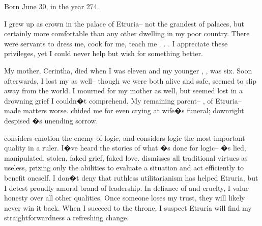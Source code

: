 \documentclass[char]{Kos}
\begin{document}
\name{\cGroom{}}

Born June 30, in the year 274.

I grew up as crown \cGroom{\prince} in the palace of Etruria-- not the grandest of palaces, but certainly more comfortable than any other dwelling in my poor country. There were servants to dress me, cook for me, teach me . . . I appreciate these privileges, yet I could never help but wish for something better.

My mother, Cerintha, died when I was eleven and my younger \cPoet{\sibling}, \cPoet{\nickname}, was six. Soon afterwards, I lost my \cPoet{\sibling} as well-- though we were both alive and safe, \cPoet{\they} seemed to slip away from the world. I mourned for my mother as well, but \cPoet{\they} seemed lost in a drowning grief I couldn�t comprehend. My remaining parent-- \cEtruriaKing{\name}, \cEtruriaKing{\Monarch} of Etruria-- made matters worse. \cEtruriaKing{\They} chided me for even crying at \cEtruriaKing{\their} wife�s funeral; \cEtruriaKing{\their} downright despised \cPoet{\nickname}�s unending sorrow. 

\cEtruriaKing{\Parent} considers emotion the enemy of logic, and \cEtruriaKing{\they} considers logic the most important quality in a ruler. I�ve heard the stories of what \cEtruriaKing{\they}�s done for logic-- \cEtruriaKing{\they}�s lied, manipulated, stolen, faked grief, faked love. \cEtruriaKing{\They} dismisses all traditional virtues as useless, prizing only the abilities to evaluate a situation and act efficiently to benefit oneself. I don�t deny that \cEtruriaKing{\their} ruthless utilitarianism has helped Etruria, but I detest \cEtruriaKing{\their} proudly amoral brand of leadership. In defiance of \cEtruriaKing{\them} and \cEtruriaKing{\their} cruelty, I value honesty over all other qualities. Once someone loses my trust, they will likely never win it back. When I succeed to the throne, I suspect Etruria will find my straightforwardness a refreshing change.
\end{document}
